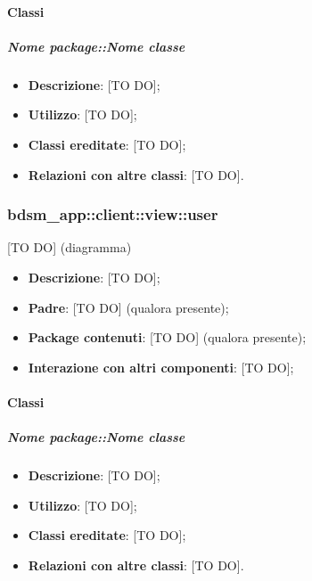 		\paragraph{Classi} %
			\subparagraph{Nome package::Nome classe} %
			\label{subp:subparagraph_name}
				\begin{itemize}
					\item \textbf{Descrizione}: [TO DO];
					\item \textbf{Utilizzo}: [TO DO];
					\item \textbf{Classi ereditate}: [TO DO];
					\item \textbf{Relazioni con altre classi}: [TO DO].
				\end{itemize}


	\subsubsection{bdsm\_app::client::view::user} %
	\label{ssub:bdsm_app_client_view_user}
	[TO DO] (diagramma) \newline \newline

	\begin{itemize}
		\item \textbf{Descrizione}: [TO DO];
		\item \textbf{Padre}: [TO DO] (qualora presente);
		\item \textbf{Package contenuti}: [TO DO] (qualora presente);
		\item \textbf{Interazione con altri componenti}: [TO DO];
	\end{itemize}

		\paragraph{Classi} %
			\subparagraph{Nome package::Nome classe} %
			\label{subp:subparagraph_name}
				\begin{itemize}
					\item \textbf{Descrizione}: [TO DO];
					\item \textbf{Utilizzo}: [TO DO];
					\item \textbf{Classi ereditate}: [TO DO];
					\item \textbf{Relazioni con altre classi}: [TO DO].
				\end{itemize}

